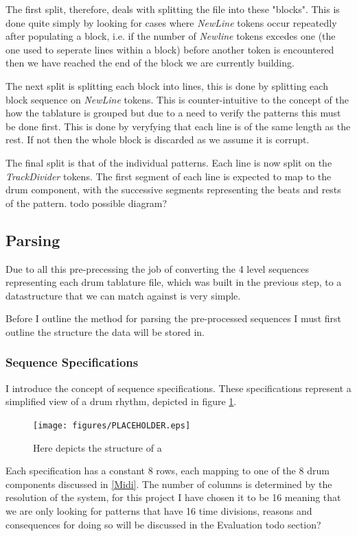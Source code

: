 \documentclass[12pt,twoside,notitlepage]{report}
\begin{document}
			The first split, therefore, deals with splitting the file into these "blocks". This is done quite simply by looking for cases where \emph{NewLine} tokens occur repeatedly after populating a block, i.e. if the number of \emph{Newline} tokens excedes one (the one used to seperate lines within a block) before another token is encountered then we have reached the end of the block we are currently building.
			
			The next split is splitting each block into lines, this is done by splitting each block sequence on \emph{NewLine} tokens. This is counter-intuitive to the concept of the how the tablature is grouped but due to a need to verify the patterns this must be done first. This is done by veryfying that each line is of the same length as the rest. If not then the whole block is discarded as we assume it is corrupt.
			
			The final split is that of the individual patterns. Each line is now split on the \emph{TrackDivider} tokens. The first segment of each line is expected to map to the drum component, with the successive segments representing the beats and rests of the pattern. todo possible diagram?
			
			
		\subsection{Parsing}\label{subsec:Parsing}
			Due to all this pre-precessing the job of converting the 4 level sequences representing each drum tablature file, which was built in the previous step, to a datastructure that we can match against is very simple.
			
			Before I outline the method for parsing the pre-processed sequences I must first outline the structure the data will be stored in.
			
			\subsubsection{Sequence Specifications}
				I introduce the concept of sequence specifications. These specifications represent a simplified view of a drum rhythm, depicted in figure \ref{fig:seqSpec}.
				
            \begin{figure}[h]
			\centerline{\texttt{[image: figures/PLACEHOLDER.eps]}}
			\caption{\label{fig:seqSpec} Here depicts the structure of a }
\end{figure}

				Each specification has a constant 8 rows, each mapping to one of the 8 drum components discussed in \ref{Midi}. The number of columns is determined by the resolution of the system, for this project I have chosen it to be 16 meaning that we are only looking for patterns that have 16 time divisions, reasons and consequences for doing so will be discussed in the Evaluation todo section?
				
\end{document}
